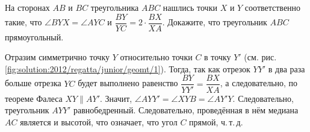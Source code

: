 На сторонах $AB$ и $BC$ треугольника $ABC$ нашлись точки $X$ и $Y$
соответственно такие, что
$\angle BYX = \angle AYC$ и $\dfrac{BY}{YC} = 2 \cdot \dfrac{BX}{XA}$.
Докажите, что треугольник $ABC$ прямоугольный.

%
\label{solution:2012/regatta/junior/geomt/1}%
Отразим симметрично точку $Y$ относительно точки $C$ в точку $Y'$
(см. рис. \ref{fig:solution:2012/regatta/junior/geomt/1}).
Тогда, так как отрезок $YY'$ в два раза больше отрезка $YC$ будет выполнено
равенство $\dfrac{BY}{YY'} = \dfrac{BX}{XA}$, а следовательно, по теореме
Фалеса $XY \parallel AY'$.
Значит, $\angle AYY' = \angle XYB = \angle AY'Y$.
Следовательно, треугольник $AYY'$ равнобедренный.
Следовательно, проведённая в нём медиана $AC$ является и высотой,
что означает, что угол $C$ прямой, ч.\,т.\,д.

